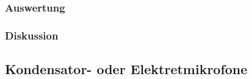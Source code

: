 \documentclass[12pt,a4paper]{article}
\begin{document}
\subsubsection*{Auswertung}
\subsubsection*{Diskussion}



\subsection{Kondensator- oder Elektretmikrofone}
\end{document}
